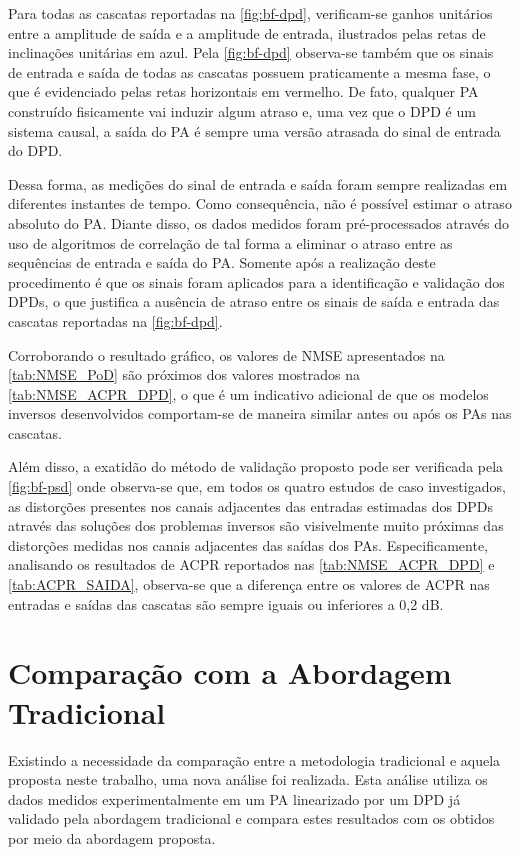 Para todas as cascatas reportadas na \autoref{fig:bf-dpd}, verificam-se ganhos unitários entre a amplitude de saída e a amplitude de entrada, ilustrados pelas retas de inclinações unitárias em azul. Pela \autoref{fig:bf-dpd} observa-se também que os sinais de entrada e saída de todas as cascatas possuem praticamente a mesma fase, o que é evidenciado pelas retas horizontais em vermelho. De fato, qualquer PA construído fisicamente vai induzir algum atraso e, uma vez que o DPD é um sistema causal, a saída do PA é sempre uma versão atrasada do sinal de entrada do DPD.

Dessa forma, as medições do sinal de entrada e saída foram sempre realizadas em diferentes instantes de tempo. Como consequência, não é possível estimar o atraso absoluto do PA. Diante disso, os dados medidos foram pré-processados através do uso de algoritmos de correlação de tal forma a eliminar o atraso entre as sequências de entrada e saída do PA. Somente após a realização deste procedimento é que os sinais foram aplicados para a identificação e validação dos DPDs, o que justifica a ausência de atraso entre os sinais de saída e entrada das cascatas reportadas na \autoref{fig:bf-dpd}.

Corroborando o resultado gráfico, os valores de NMSE apresentados na \autoref{tab:NMSE_PoD} são próximos dos valores mostrados na \autoref{tab:NMSE_ACPR_DPD}, o que é um indicativo adicional de que os modelos inversos desenvolvidos comportam-se de maneira similar antes ou após os PAs nas cascatas.

Além disso, a exatidão do método de validação proposto pode ser verificada pela \autoref{fig:bf-psd} onde observa-se que, em todos os quatro estudos de caso investigados, as distorções presentes nos canais adjacentes das entradas estimadas dos DPDs através das soluções dos problemas inversos são visivelmente muito próximas das distorções medidas nos canais adjacentes das saídas dos PAs. Especificamente, analisando os resultados de ACPR reportados nas \autoref{tab:NMSE_ACPR_DPD} e \autoref{tab:ACPR_SAIDA}, observa-se que a diferença entre os valores de ACPR nas entradas e saídas das cascatas são sempre iguais ou inferiores a 0,2 dB.

\section{Comparação com a Abordagem Tradicional} \label{sec:compara}

Existindo a necessidade da comparação entre a metodologia tradicional e aquela proposta neste trabalho, uma nova análise foi realizada. Esta análise utiliza os dados medidos experimentalmente em um PA linearizado por um DPD já validado pela abordagem tradicional e compara estes resultados com os obtidos por meio da abordagem proposta.


